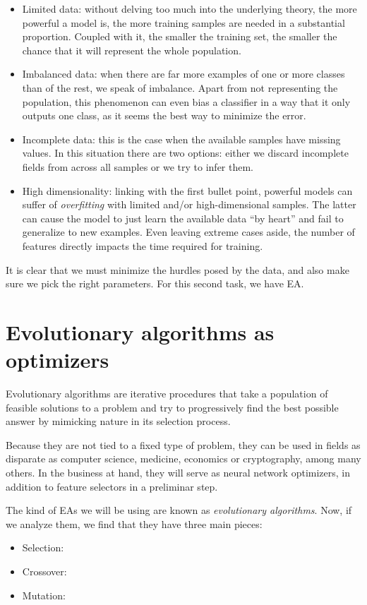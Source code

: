     \begin{itemize}

    	\item
    	Limited data: without delving too much into the underlying theory, the more powerful a model is, the more training samples are needed in a substantial proportion. Coupled with it, the smaller the training set, the smaller the chance that it will represent the whole population.

    	\item
    	Imbalanced data: when there are far more examples of one or more classes than of the rest, we speak of imbalance. Apart from not representing the population, this phenomenon can even bias a classifier in a way that it only outputs one class, as it seems the best way to minimize the error.

    	\item
    	Incomplete data: this is the case when the available samples have missing values. In this situation there are two options: either we discard incomplete fields from across all samples or we try to infer them.

    	\item
    	High dimensionality: linking with the first bullet point, powerful models can suffer of \textit{overfitting} with limited and/or high-dimensional samples. The latter can cause the model to just learn the available data ``by heart'' and fail to generalize to new examples. Even leaving extreme cases aside, the number of features directly impacts the time required for training.

    \end{itemize}

    It is clear that we must minimize the hurdles posed by the data, and also make sure we pick the right parameters. For this second task, we have \acf{EA}.

\section{Evolutionary algorithms as optimizers}

	Evolutionary algorithms are iterative procedures that take a population of feasible solutions to a problem and try to progressively find the best possible answer by mimicking nature in its selection process. 

	Because they are not tied to a fixed type of problem, they can be used in fields as disparate as computer science, medicine, economics or cryptography, among many others. In the business at hand, they will serve as neural network optimizers, in addition to feature selectors in a preliminar step.

\newpage

	The kind of \acs{EA}s we will be using are known as \textit{evolutionary algorithms}. Now, if we analyze them, we find that they have three main pieces:

	\begin{itemize}

		\item
		Selection:

		\item
		Crossover:

		\item
		Mutation:

	\end{itemize}